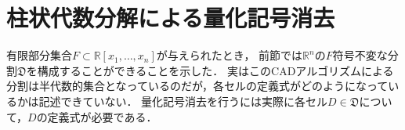\documentclass[uplatex, dvipdfmx]{jsarticle}
\newcommand{\R}{\mathbb{R}}
\newcommand{\PROJ}{\mathrm{PROJ}}
\theoremstyle{definition}
\newtheorem{definition}{定義}[section]
\begin{document}






\section{柱状代数分解による量化記号消去}
有限部分集合$F \subset \R[x_1, \dots, x_n]$が与えられたとき，
前節では$\R^n$の$F$符号不変な分割$\mathfrak{D}$を構成することができることを示した．
実はこのCADアルゴリズムによる分割は半代数的集合となっているのだが，各セルの定義式がどのようになっているかは記述できていない．
量化記号消去を行うには実際に各セル$D \in \mathfrak{D}$について，$D$の定義式が必要である．
\end{document}
